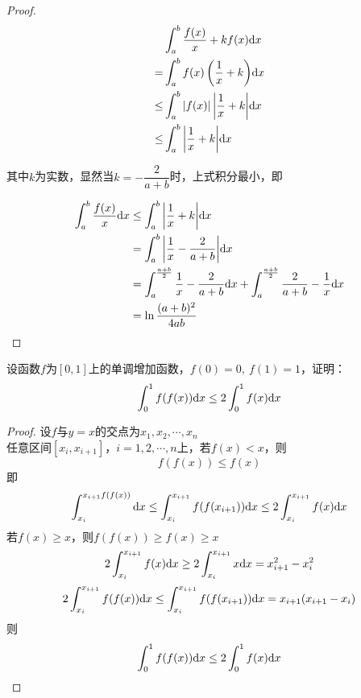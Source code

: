 \begin{proof}

    \begin{align*}
        & \int_{a}^{b}{\dfrac{f(x)}{x} + kf(x)}\mathrm{d} x \\
        = & \int_{a}^{b}{f(x) \left(\dfrac{1}{x} + k \right)}\mathrm{d} x \\
        \leq & \int_{a}^{b}{|f(x)| \left|\dfrac{1}{x} + k \right|}\mathrm{d} x \\
        \leq & \int_{a}^{b}{\left| \dfrac{1}{x} + k \right|}\mathrm{d} x
    \end{align*}

    其中$k$为实数，显然当$k = - \dfrac{2}{a+b}$时，上式积分最小，即

    \begin{align*}
        \int_{a}^{b}{\dfrac{f(x)}{x}}\mathrm{d} x & \leq \int_{a}^{b}{\left| \dfrac{1}{x} + k \right|}\mathrm{d} x \\  
        & = \int_{a}^{b}{\left| \dfrac{1}{x} - \dfrac{2}{a+b} \right|}\mathrm{d} x \\
        & = \int_{a}^{\frac{a+b}{2}}{\dfrac{1}{x} - \dfrac{2}{a+b}}\mathrm{d} x + \int_{a}^{\frac{a+b}{2}}{\dfrac{2}{a+b} - \dfrac{1}{x}}\mathrm{d} x \\
        & = \ln{\dfrac{(a+b)^2}{4ab}}
    \end{align*}

\end{proof}

\begin{proposition}

    设函数$f$为$[0,1]$上的单调增加函数，$f(0) = 0, \ f(1) = 1$，证明：
    $$\int_{0}^{1}{f(f(x))}\mathrm{d} x \leq 2\int_{0}^{1}{f(x)}\mathrm{d} x$$

\end{proposition}

\begin{proof}

    设$f$与$y = x$的交点为$x_1, x_2, \cdots , x_n$\\
    任意区间$[x_i, x_{i+1}]$，$i = 1, 2, \cdots, n$上，若$f(x) < x$，则
    $$f(f(x)) \leq f(x)$$
    即
    $$\int_{x_i}^{x_{i+1}{f(f(x))}}\mathrm{d} x \leq \int_{x_i}^{x_{i+1}}{f(f(x_{i+1}))}\mathrm{d} x \leq 2\int_{x_i}^{x_{i+1}}{f(x)}\mathrm{d} x$$
    若$f(x) \geq x$，则$f(f(x)) \geq f(x) \geq x$
    $$2\int_{x_i}^{x_{i+1}}{f(x)}\mathrm{d} x \geq 2\int_{x_i}^{x_{i+1}}{x}\mathrm{d} x = x_{i+1}^2 - x_i^2$$
    $$2\int_{x_i}^{x_{i+1}}{f(f(x))}\mathrm{d} x \leq \int_{x_i}^{x_{i+1}}{f(f(x_{i+1}))}\mathrm{d} x = x_{i+1}(x_{i+1} - x_i)$$
    则
    $$\int_{0}^{1}{f(f(x))}\mathrm{d} x \leq 2\int_{0}^{1}{f(x)}\mathrm{d} x$$

\end{proof}

